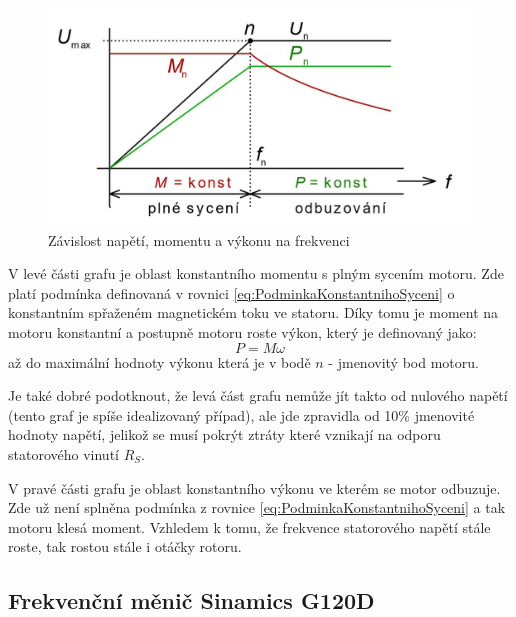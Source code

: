 \begin{figure}[hptb]
	\centering
	\includegraphics[width=1\linewidth]{images/ProvozniRezimyAMSFrekvencnimMenicem}
	\caption{Závislost napětí, momentu a výkonu na frekvenci \cite{SkriptaRizeniOtacekAM}}
	\label{fig:provoznirezimyamsfrekvencnimmenicem}
\end{figure}

V levé části grafu je oblast konstantního momentu s plným sycením motoru. Zde platí podmínka definovaná v rovnici \ref{eq:PodminkaKonstantnihoSyceni} o konstantním spřaženém magnetickém toku ve statoru. Díky tomu je moment na motoru konstantní a postupně motoru roste výkon, který je definovaný jako:
\begin{equation}
	P = M\omega
	\label{eq:vykonmotoru}
\end{equation}
až do maximální hodnoty výkonu která je v bodě $n$ - jmenovitý bod motoru.

Je také dobré podotknout, že levá část grafu nemůže jít takto od nulového napětí (tento graf je spíše idealizovaný případ), ale jde zpravidla od 10\% jmenovité hodnoty napětí, jelikož se musí pokrýt ztráty které vznikají na odporu statorového vinutí $R_S$. \cite{SkriptaRizeniOtacekAM}

V pravé části grafu je oblast konstantního výkonu ve kterém se motor odbuzuje. Zde už není splněna podmínka z rovnice \ref{eq:PodminkaKonstantnihoSyceni} a tak motoru klesá moment. Vzhledem k tomu, že frekvence statorového napětí stále roste, tak rostou stále i otáčky rotoru.

\subsection{Frekvenční měnič Sinamics G120D}

